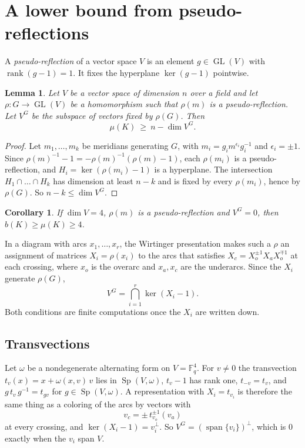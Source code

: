 \documentclass[11pt]{amsart}
\newtheorem{lemma}[theorem]{Lemma}
\newtheorem{corollary}[theorem]{Corollary}
\theoremstyle{definition}
\theoremstyle{remark}
\numberwithin{equation}{section}
\newcommand{\F}{\mathbb{F}}
\DeclareMathOperator{\rk}{rank}
\DeclareMathOperator{\Sp}{Sp}
\DeclareMathOperator{\GL}{GL}
\begin{document}
\section{A lower bound from pseudo-reflections}\label{sec:pseudo}

A \emph{pseudo-reflection} of a vector space $V$ is an element $g\in\GL(V)$ with
$\rk(g-1)=1$. It fixes the hyperplane $\ker(g-1)$ pointwise.

\begin{lemma}\label{lem:fixed}
Let $V$ be a vector space of dimension $n$ over a field and let $\rho\colon G\to\GL(V)$ be
a homomorphism such that $\rho(m)$ is a pseudo-reflection. Let $V^{G}$ be the subspace of
vectors fixed by $\rho(G)$. Then
\[
\mu(K)\ \ge\ n-\dim V^{G}.
\]
\end{lemma}

\begin{proof}
Let $m_1,\dots,m_k$ be meridians generating $G$, with $m_i=g_im^{\epsilon_i}g_i^{-1}$ and
$\epsilon_i=\pm1$. Since $\rho(m)^{-1}-1=-\rho(m)^{-1}(\rho(m)-1)$, each $\rho(m_i)$
is a pseudo-reflection, and $H_i=\ker(\rho(m_i)-1)$ is a hyperplane. The intersection
$H_1\cap\dots\cap H_k$ has dimension at least $n-k$ and is fixed by every $\rho(m_i)$,
hence by $\rho(G)$. So $n-k\le\dim V^G$.
\end{proof}

\begin{corollary}\label{cor:four}
If $\dim V=4$, $\rho(m)$ is a pseudo-reflection and $V^G=0$, then $b(K)\ge\mu(K)\ge4$.
\end{corollary}

In a diagram with arcs $x_1,\dots,x_r$, the Wirtinger presentation makes such a $\rho$ an
assignment of matrices $X_i=\rho(x_i)$ to the arcs that satisfies
$X_c=X_o^{\pm1}X_aX_o^{\mp1}$ at each crossing, where $x_o$ is the overarc and $x_a,x_c$
are the underarcs. Since the $X_i$ generate $\rho(G)$,
\[
V^G=\bigcap_{i=1}^{r}\ker(X_i-1).
\]
Both conditions are finite computations once the $X_i$ are written down.

\subsection*{Transvections}
Let $\omega$ be a nondegenerate alternating form on $V=\F_q^4$. For $v\ne0$ the
transvection $t_v(x)=x+\omega(x,v)\,v$ lies in $\Sp(V,\omega)$, $t_v-1$ has rank one,
$t_{-v}=t_v$, and $g\,t_v\,g^{-1}=t_{gv}$ for $g\in\Sp(V,\omega)$. A representation with
$X_i=t_{v_i}$ is therefore the same thing as a coloring of the arcs by vectors with
\[
v_c=\pm\,t_{v_o}^{\pm1}(v_a)
\]
at every crossing, and $\ker(X_i-1)=v_i^{\perp}$. So
$V^G=(\operatorname{span}\{v_i\})^{\perp}$, which is $0$ exactly when the $v_i$ span $V$.
\end{document}
